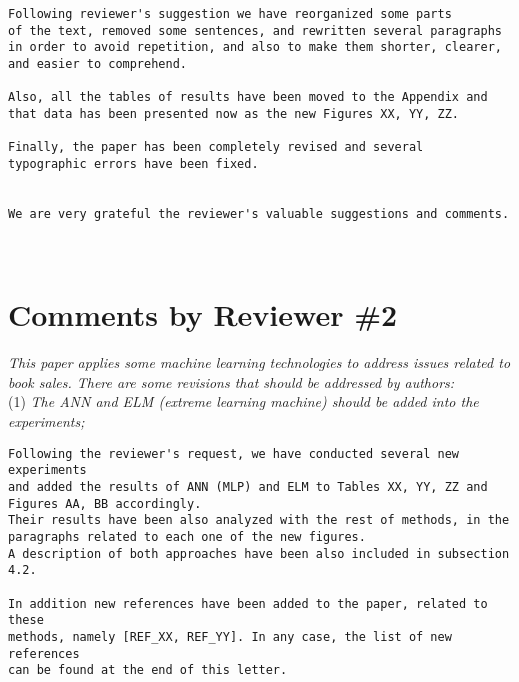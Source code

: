 \documentclass[preprint]{elsarticle}
\begin{document}
\begin{verbatim}
Following reviewer's suggestion we have reorganized some parts 
of the text, removed some sentences, and rewritten several paragraphs 
in order to avoid repetition, and also to make them shorter, clearer, 
and easier to comprehend. 

Also, all the tables of results have been moved to the Appendix and 
that data has been presented now as the new Figures XX, YY, ZZ.

Finally, the paper has been completely revised and several 
typographic errors have been fixed. 


We are very grateful the reviewer's valuable suggestions and comments. 
\end{verbatim}


~\\

\section{Comments by Reviewer \#2}

\noindent \emph{This paper applies some machine learning technologies to address issues related to book sales. There are some revisions that should be addressed by authors: } \\


\noindent (1) \emph{The ANN and ELM (extreme learning machine) should be added into the experiments; } 

\begin{verbatim}
Following the reviewer's request, we have conducted several new experiments 
and added the results of ANN (MLP) and ELM to Tables XX, YY, ZZ and
Figures AA, BB accordingly. 
Their results have been also analyzed with the rest of methods, in the 
paragraphs related to each one of the new figures.
A description of both approaches have been also included in subsection 4.2.

In addition new references have been added to the paper, related to these 
methods, namely [REF_XX, REF_YY]. In any case, the list of new references
can be found at the end of this letter.
\end{verbatim}
\end{document}
